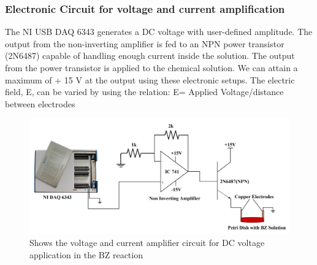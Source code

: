 \documentclass[journal=jacsat,manuscript=article]{achemso}
\begin{document}
\subsubsection{Electronic Circuit for voltage and current amplification}
The NI USB DAQ 6343 generates a DC voltage with user-defined amplitude. The output from the non-inverting amplifier is fed to an NPN power transistor (2N6487) capable of handling enough current inside the solution. The output from the power transistor is applied to the chemical solution. We can attain a maximum of + 15 V at the output using these electronic setups. The electric field, E,  can be varied by using the relation: 
E= Applied Voltage/distance between electrodes
\begin{figure}[H]
    \centering
    \includegraphics[width=\linewidth]{pulse circuit - Copy.jpg}
    \caption{Shows the voltage and current amplifier circuit for DC voltage application in the BZ reaction}
    \label{fig:ex2}
\end{figure}
\end{document}
